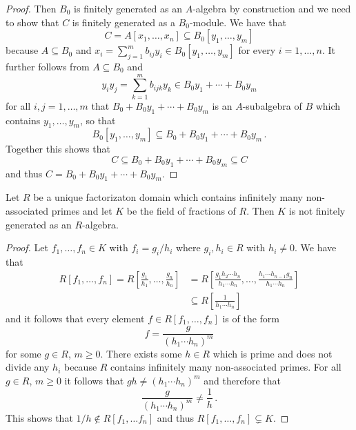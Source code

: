 \begin{proof}
  Then $B_0$ is finitely generated as an $A$-algebra by construction and we need to show that $C$ is finitely generated as a $B_0$-module.
  We have that
  \[
              C
    =         A[x_1, \dotsc, x_n]
    \subseteq B_0[y_1, \dotsc, y_m]
  \]
  because $A \subseteq B_0$ and $x_i = \sum_{j=1}^m b_{ij} y_i \in B_0[y_1, \dotsc, y_m]$ for every $i = 1, \dotsc, n$.
  It further follows from $A \subseteq B_0$ and
  \[
        y_i y_j
    =   \sum_{k=1}^m b_{ijk} y_k
    \in B_0 y_1 + \dotsb + B_0 y_m
  \]
  for all $i, j = 1, \dotsc, m$ that $B_0 + B_0 y_1 + \dotsb + B_0 y_m$ is an $A$-subalgebra of $B$ which contains $y_1, \dotsc, y_m$, so that
  \[
              B_0[y_1, \dotsc, y_m]
    \subseteq B_0 + B_0 y_1 + \dotsb + B_0 y_m \,.
  \]
  Together this shows that
  \[
              C
    \subseteq B_0 + B_0 y_1 + \dotsb + B_0 y_m
    \subseteq C
  \]
  and thus $C = B_0 + B_0 y_1 + \dotsb + B_0 y_m$.
\end{proof}


\begin{lemma}
  \label{lemma: field of fractions not finitely generated}
  Let $R$ be a unique factorizaton domain which contains infinitely many non-associated primes and let $K$ be the field of fractions of $R$.
  Then $K$ is not finitely generated as an $R$-algebra.
\end{lemma}


\begin{proof}
  Let $f_1, \dotsc, f_n \in K$ with $f_i = g_i/h_i$ where $g_i, h_i \in R$ with $h_i \neq 0$.
  We have that
  \begin{align*}
                R[f_1, \dotsc, f_n]
     =          R\left[ \frac{g_1}{h_1}, \dotsc, \frac{g_n}{h_n} \right]
    &=          R\left[
                  \frac{g_1 h_2 \dotsm h_n}{h_1 \dotsm h_n},
                  \dotsc,
                  \frac{h_1 \dotsm h_{n-1} g_n}{h_1 \dotsm h_n}
                \right] \\
    &\subseteq  R\left[ \frac{1}{h_1 \dotsm h_n} \right]
  \end{align*}
  and it follows that every element $f \in R[f_1, \dotsc, f_n]$ is of the form
  \[
      f
    = \frac{g}{(h_1 \dotsm h_n)^m}
  \]
  for some $g \in R$, $m \geq 0$.
  There exists some $h \in R$ which is prime and does not divide any $h_i$ because $R$ contains infinitely many non-associated primes.
  For all $g \in R$, $m \geq 0$ it follows that $gh \neq (h_1 \dotsm h_n)^m$ and therefore that
  \[
    \frac{g}{(h_1 \dotsm h_n)^m} \neq \frac{1}{h} \,.
  \]
  This shows that $1/h \notin R[f_1, \dotsc f_n]$ and thus $R[f_1, \dotsc, f_n] \subsetneq K$.
\end{proof}



